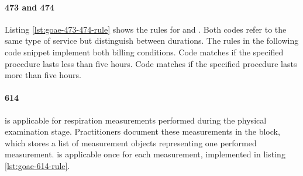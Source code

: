 \paragraph{473 and 474}
Listing \ref{lst:goae-473-474-rule} shows the rules for 
and
.
Both codes refer to the same type of service but distinguish between durations.
The rules in the following code snippet implement both billing conditions.
Code  matches if the specified procedure lasts less than five hours.
Code  matches if the specified procedure lasts more than five hours.



\paragraph{614}
 is applicable for respiration measurements performed during the physical examination stage.
Practitioners document these measurements in the  block, which stores a list of measurement objects representing one performed measurement.
 is applicable once for each measurement, implemented in listing \ref{lst:goae-614-rule}.


